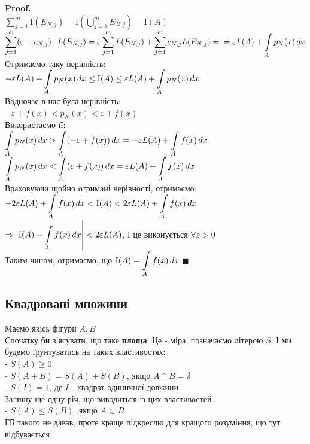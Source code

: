 \documentclass[a4paper, 14pt]{extarticle}
\def\huge{\displaystyle}
\def\bigline{\vspace{5mm}\\}
\theoremstyle{theoremdd}
\theoremstyle{theoremdd}
\theoremstyle{theoremdd}
\theoremstyle{theoremdd}
\theoremstyle{theoremdd}
\theoremstyle{theoremdd}
\theoremstyle{theoremdd}
\theoremstyle{theoremdd}
\newenvironment{pf}{\vspace*{-3mm} \textbf{Proof. \\}}{$\blacksquare$}
\begin{document}
\begin{pf}
$\huge \sum_{j=1}^m \mathrm{I}(E_{N,j}) = \mathrm{I}\left( \bigcup_{j=1}^m E_{N,j} \right) = \mathrm{I}(A)$\\
$\huge \sum_{j=1}^m (\varepsilon + c_{N,j}) \cdot L(E_{N,j}) = \varepsilon \sum_{j=1}^m L(E_{N,j}) + \sum_{j=1}^m c_{N,j} L(E_{N,j}) = \\ = \varepsilon L(A) + \int\displaylimits_A p_N(x) \,dx$\\
Отримаємо таку нерівність:\\
$\huge -\varepsilon L(A) + \int\displaylimits_A p_N(x) \,dx \leq \mathrm{I}(A) \leq \varepsilon L(A) + \int\displaylimits_A p_N(x) \,dx$\\
Водночас в нас була нерівність:\\
$-\varepsilon + f(x) < p_N(x) < \varepsilon + f(x)$\\
Використаємо її:\\
$\huge \int\displaylimits_A p_N(x) \,dx > \int\displaylimits_A (-\varepsilon + f(x)) \,dx = -\varepsilon L(A) + \int\displaylimits_A f(x)\,dx$\\
$\huge \int\displaylimits_A p_N(x) \,dx < \int\displaylimits_A (\varepsilon + f(x)) \,dx = \varepsilon L(A) + \int\displaylimits_A f(x)\,dx$\\
Враховуючи щойно отримані нерівності, отримаємо:\\
$-2\varepsilon L(A) + \huge \int\displaylimits_A f(x)\,dx < \mathrm{I}(A) < 2\varepsilon L(A) + \huge \int\displaylimits_A f(x)\,dx$\\
$\Rightarrow \huge \abs{\mathrm{I}(A) - \int\displaylimits_A f(x)\,dx} < 2 \varepsilon L(A)$. І це виконується $\forall \varepsilon > 0$\\
Таким чином, отримаємо, що $\mathrm{I}(A) = \huge \int\displaylimits_A f(x)\,dx$
\end{pf}

\subsection{Квадровані множини}
Маємо якісь фігури $A,B$\\
Спочатку би з'ясувати, що таке \textbf{площа}. Це - міра, позначаємо літерою $S$. І ми будемо ґрунтуватись на таких властивостях:\\
- $S(A) \geq 0$ \\
- $S(A+B) = S(A) + S(B)$, якщо $A \cap B = \emptyset$\\
- $S(I) = 1$, де $I$ - квадрат одиничної довжини
\bigline
Залишу ще одну річ, що виводиться із цих властивостей\\
- $S(A) \leq S(B)$, якщо $A \subset B$
\bigline
ГБ такого не давав, проте краще підкреслю для кращого розуміння, що тут відбувається
\bigline
\end{document}
